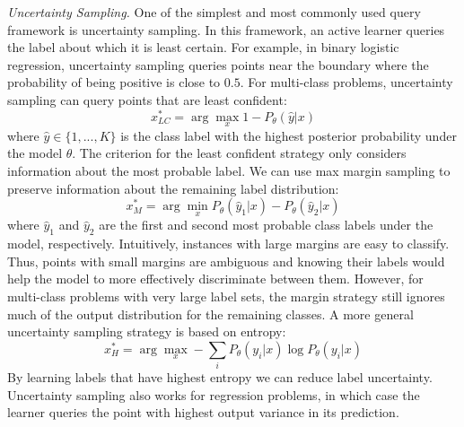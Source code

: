 \textit{Uncertainty Sampling.} One of the simplest and most commonly used query framework is uncertainty sampling. In this framework, an active learner queries the label about which it is least certain. For example, in binary logistic regression, uncertainty sampling queries points near the boundary where the probability of being positive is close to $0.5$. For multi-class problems, uncertainty sampling can query points that are least confident:
\begin{equation}
    x_{LC}^{\ast} = \arg \max_x 1 - P_{\theta}(\hat{y}|x)
\end{equation}
where $\hat{y} \in \{1,...,K\}$ is the class label with the highest posterior probability under the model $\theta$. The criterion for the least confident strategy only considers information about the most probable label. We can use max margin sampling to preserve information about the remaining label distribution:
\begin{equation}
    x_{M}^{\ast} = \arg \min_x P_{\theta}(\hat{y}_1|x) - P_{\theta}(\hat{y}_2|x)
\end{equation}
where $\hat{y}_1$ and $\hat{y}_2$ are the first and second most probable class labels under the model, respectively. Intuitively, instances with large margins are easy to classify. Thus, points with small margins are ambiguous and knowing their labels would help the model to more effectively discriminate between them. However, for multi-class problems with very large label sets, the margin strategy still ignores much of the output distribution for the remaining classes. A more general uncertainty sampling strategy is based on entropy:
\begin{equation}
    x_{H}^{\ast} = \arg \max_x -\sum_i P_{\theta}(y_i|x)\log P_{\theta}(y_i|x)
\end{equation}
By learning labels that have highest entropy we can reduce label uncertainty. Uncertainty sampling also works for regression problems, in which case the learner queries the point with highest output variance in its prediction.\\

